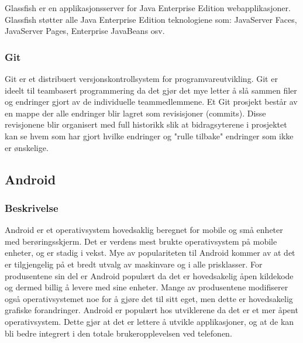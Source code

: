 \documentclass[../main.tex]{subfiles}
\begin{document}
Glassfish er en applikasjonsserver for Java Enterprise Edition webapplikasjoner. Glassfish støtter alle Java Enterprise Edition teknologiene som: JavaServer Faces, JavaServer Pages, Enterprise JavaBeans osv. 

\subsubsection{Git}

Git er et distribuert versjonskontrollsystem for programvareutvikling.  Git er ideelt til teambasert programmering da det gjør det mye letter å slå sammen filer og endringer gjort av de individuelle teammedlemmene. Et Git prosjekt består av en mappe der alle endringer blir lagret som revisisjoner (commits). Disse revisjonene blir organisert med full historikk slik at bidragsyterene i prosjektet kan se hvem som har gjort hvilke endringer og "rulle tilbake" endringer som ikke er ønskelige.  

\subsection{Android}

\subsubsection{Beskrivelse}

Android er et operativsystem hovedsaklig beregnet for mobile og små enheter med berøringsskjerm. Det er verdens mest brukte operativsystem på mobile enheter, og er stadig i vekst.  Mye av populariteten til Android kommer av at det er tilgjengelig på et bredt utvalg av maskinvare og i alle prisklasser.  For produsentene sin del er Android populært da det er hovedsakelig åpen kildekode  og dermed billig å levere med sine enheter. Mange av produsentene modifiserer også operativsystemet noe for å gjøre det til sitt eget, men dette er hovedsakelig grafiske forandringer.\newline
Android er populært hos utviklerene da det er et mer åpent operativsystem. Dette gjør at det er lettere å utvikle applikasjoner, og at de kan bli bedre integrert i den totale brukeropplevelsen ved telefonen. 
\end{document}
